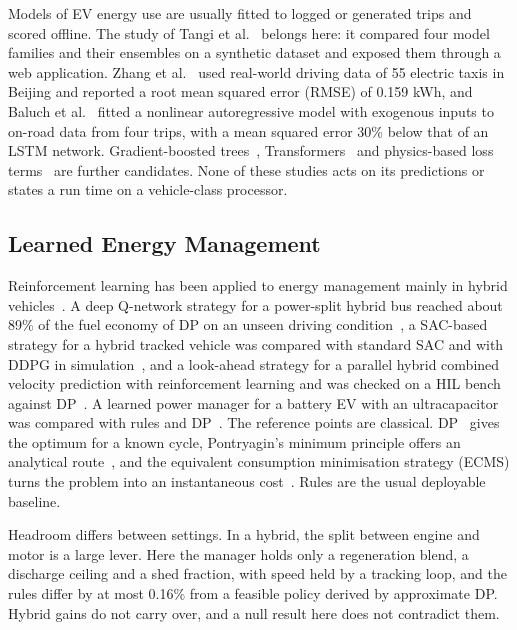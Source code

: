 \documentclass{ieeeaccess}
\begin{document}
Models of EV energy use are usually fitted to logged or generated trips and scored offline. The study of Tangi et al.~\cite{tangi2025} belongs here: it compared four model families and their ensembles on a synthetic dataset and exposed them through a web application. Zhang et al.~\cite{zhang2020} used real-world driving data of 55 electric taxis in Beijing and reported a root mean squared error (RMSE) of 0.159 kWh, and Baluch et al.~\cite{baluch2026} fitted a nonlinear autoregressive model with exogenous inputs to on-road data from four trips, with a mean squared error 30\% below that of an LSTM network. Gradient-boosted trees~\cite{chen2016}, Transformers~\cite{vaswani2017} and physics-based loss terms~\cite{raissi2019} are further candidates. None of these studies acts on its predictions or states a run time on a vehicle-class processor.

\subsection{Learned Energy Management}

Reinforcement learning has been applied to energy management mainly in hybrid vehicles~\cite{hu2019}. A deep Q-network strategy for a power-split hybrid bus reached about 89\% of the fuel economy of DP on an unseen driving condition~\cite{wu2018}, a SAC-based strategy for a hybrid tracked vehicle was compared with standard SAC and with DDPG in simulation~\cite{sun2022}, and a look-ahead strategy for a parallel hybrid combined velocity prediction with reinforcement learning and was checked on a HIL bench against DP~\cite{liu2017}. A learned power manager for a battery EV with an ultracapacitor was compared with rules and DP~\cite{xiong2018}. The reference points are classical. DP~\cite{bellman1957} gives the optimum for a known cycle, Pontryagin's minimum principle offers an analytical route~\cite{kim2011}, and the equivalent consumption minimisation strategy (ECMS) turns the problem into an instantaneous cost~\cite{paganelli2002,sciarretta2004}. Rules are the usual deployable baseline.

Headroom differs between settings. In a hybrid, the split between engine and motor is a large lever. Here the manager holds only a regeneration blend, a discharge ceiling and a shed fraction, with speed held by a tracking loop, and the rules differ by at most 0.16\% from a feasible policy derived by approximate DP. Hybrid gains do not carry over, and a null result here does not contradict them.
\end{document}
